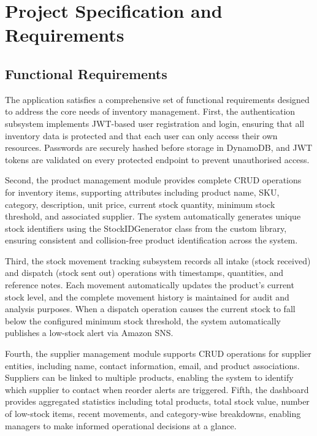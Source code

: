 \documentclass[conference]{IEEEtran}
\begin{document}
\section{Project Specification and Requirements}

\subsection{Functional Requirements}

The application satisfies a comprehensive set of functional requirements designed to address the core needs of inventory management. First, the authentication subsystem implements JWT-based user registration and login, ensuring that all inventory data is protected and that each user can only access their own resources. Passwords are securely hashed before storage in DynamoDB, and JWT tokens are validated on every protected endpoint to prevent unauthorised access.

Second, the product management module provides complete CRUD operations for inventory items, supporting attributes including product name, SKU, category, description, unit price, current stock quantity, minimum stock threshold, and associated supplier. The system automatically generates unique stock identifiers using the StockIDGenerator class from the custom library, ensuring consistent and collision-free product identification across the system.

Third, the stock movement tracking subsystem records all intake (stock received) and dispatch (stock sent out) operations with timestamps, quantities, and reference notes. Each movement automatically updates the product's current stock level, and the complete movement history is maintained for audit and analysis purposes. When a dispatch operation causes the current stock to fall below the configured minimum stock threshold, the system automatically publishes a low-stock alert via Amazon SNS.

Fourth, the supplier management module supports CRUD operations for supplier entities, including name, contact information, email, and product associations. Suppliers can be linked to multiple products, enabling the system to identify which supplier to contact when reorder alerts are triggered. Fifth, the dashboard provides aggregated statistics including total products, total stock value, number of low-stock items, recent movements, and category-wise breakdowns, enabling managers to make informed operational decisions at a glance.
\end{document}
